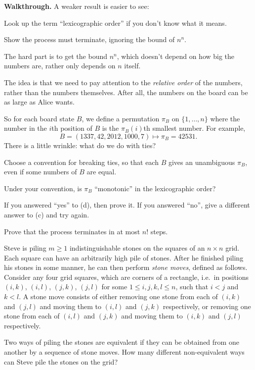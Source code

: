 \documentclass[11pt]{scrartcl}
\providecommand{\ii}{\item}
\providecommand{\printpuid}[1]{\marginpar{\href{https://otis.evanchen.cc/arch/#1}{\ttfamily\footnotesize\color{green!40!black}#1}}}
\newenvironment{walkthrough}{\noindent\textbf{\color{green!40!black}Walkthrough.}}{}
\begin{document}
\begin{walkthrough}
	A weaker result is easier to see:
	\begin{walk}
		\ii Look up the term ``lexicographic order'' if you don't know what it means.
		\ii Show the process must terminate, ignoring the bound of $n^n$.
	\end{walk}
	The hard part is to get the bound $n^n$,
	which doesn't depend on how big the numbers are,
	rather only depends on $n$ itself.

	The idea is that we need to pay attention to the \emph{relative order}
	of the numbers, rather than the numbers themselves.
	After all, the numbers on the board can be as large as Alice wants.

	So for each board state $B$,
	we define a permutation $\pi_B$ on $\{1,\dots,n\}$
	where the number in the $i$th position of $B$
	is the $\pi_B(i)$th smallest number. For example,
	\[ B = (1337, 42, 2012, 1000, 7)
		\longmapsto \pi_B = 42531. \]
	There is a little wrinkle: what do we do with ties?
	\begin{walk}[resume]
		\ii Choose a convention for breaking ties, so that each $B$ gives
		an unambiguous $\pi_B$, even if some numbers of $B$ are equal.
		\ii Under your convention, is $\pi_B$ ``monotonic'' in the lexicographic order?
		\ii If you answered ``yes'' to (d), then prove it.
		If you answered ``no'', give a different answer to (c) and try again.
		\ii Prove that the process terminates in at most $n!$ steps.
	\end{walk}
\end{walkthrough}

\begin{example*}
	Steve is piling $m\geq 1$ indistinguishable stones
	on the squares of an $n\times n$ grid.
	Each square can have an arbitrarily high pile of stones.
	After he finished piling his stones in some manner,
	he can then perform \emph{stone moves}, defined as follows.
	Consider any four grid squares, which are corners of a rectangle,
	i.e.\ in positions $(i, k)$, $(i, l)$, $(j, k)$, $(j, l)$
	for some $1\leq i, j, k, l\leq n$, such that $i<j$ and $k<l$.
	A stone move consists of either removing one stone from each of
	$(i, k)$ and $(j, l)$ and moving them to $(i, l)$ and $(j, k)$ respectively,
	or removing one stone from each of $(i, l)$ and $(j, k)$
	and moving them to $(i, k)$ and $(j, l)$ respectively.

	Two ways of piling the stones are equivalent if they can be obtained
	from one another by a sequence of stone moves.
	How many different non-equivalent ways can Steve pile the stones on the grid?
\end{example*} \printpuid{15AMO4}
\end{document}
